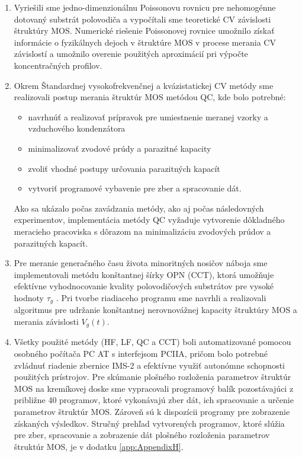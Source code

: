 \begin{enumerate}

\item Vyriešili sme jedno-dimenzionálnu Poissonovu rovnicu pre
  nehomogénne dotovaný substrát polovodiča a vypočítali sme teoretické
  CV závislosti štruktúry MOS. Numerické riešenie Poissonovej rovnice
  umožnilo získať informácie o fyzikálnych dejoch v štruktúre MOS v
  procese merania CV závislostí a umožnilo overenie použitých
  aproximácií pri výpočte koncentračných profilov.

\item Okrem Štandardnej vysokofrekvenčnej a kvázistatickej CV
  metódy sme realizovali postup merania štruktúr MOS metódou QC, kde
  bolo potrebné:

\begin{itemize}
\item navrhnúť a realizovať prípravok pre umiestnenie meranej vzorky a
  vzduchového kondenzátora
\item  minimalizovať zvodové prúdy a parazitné kapacity
\item zvoliť vhodné postupy určovania parazitných kapacít
\item vytvoriť programové vybavenie pre zber a spracovanie dát.
\end{itemize}

Ako sa ukázalo počas zavádzania metódy, ako aj počas následovných
experimentov, implementácia metódy QC vyžaduje vytvorenie dôkladného
meracieho pracoviska s dôrazom na minimalizáciu zvodových prúdov a
parazitných kapacít.

\item Pre meranie generačného času života minoritných nosičov náboja
  sme implementovali metódu konštantnej šírky OPN (CCT), ktorá
  umožňuje efektívne vyhodnocovanie kvality polovodičových substrátov
  pre vysoké hodnoty $\tau_{g}$ . Pri tvorbe riadiaceho programu sme
  navrhli a realizovali algoritmus pre udržanie konštantnej
  nerovnovážnej kapacity štruktúry MOS a merania závislosti
  $V_{g}(t)$.

\item Všetky použité metódy (HF, LF, QC a CCT) boli automatizované
  pomocou osobného počítača PC AT s interfejsom PCIIA, pričom bolo
  potrebné zvládnuť riadenie zbernice IMS-2 a efektívne využiť
  autonómne schopnosti použitých prístrojov. Pre skúmanie plošného
  rozloženia parametrov štruktúr MOS na kremíkovej doske sme
  vypracovali programový balík pozostávajúci z približne 40 programov,
  ktoré vykonávajú zber dát, ich spracovanie a určenie parametrov
  štruktúr MOS.  Zároveň sú k dispozícii programy pre zobrazenie
  získaných výsledkov.  Stručný prehľad vytvorených programov, ktoré
  slúžia pre zber, spracovanie a zobrazenie dát plošného rozloženia
  parametrov štruktúr MOS, je v dodatku \ref{app:AppendixH}.


\end{enumerate}

